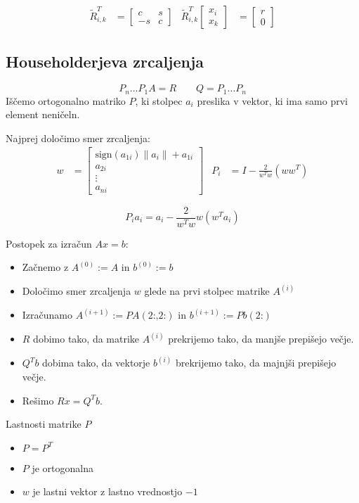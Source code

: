\begin{multicols}{5}
\begin{align*}
	\tilde{R}_{i,k}^T &= \begin{bmatrix}
		c & s \\
		-s & c
	\end{bmatrix} &
	\tilde{R}_{i,k}^T \begin{bmatrix}
		x_i \\ x_k
	\end{bmatrix}
	&=
	\begin{bmatrix}
		r \\ 0
	\end{bmatrix}
\end{align*}

\subsection{Householderjeva zrcaljenja}
\[ P_n \dots P_1 A = R \qquad Q = P_1 \dots P_n\]
Iščemo ortogonalno matriko $P$, ki stolpec $a_i$ preslika v vektor, ki ima samo prvi element neničeln.

Najprej določimo smer zrcaljenja:
\begin{align*}
	w &= \begin{bmatrix}
		\text{sign}(a_{1i}) \| a_i \| + a_{1i} \\
		a_{2i} \\
		\vdots \\
		a_{ni}
	\end{bmatrix} &
	P_i &= I - \frac{2}{w^Tw}(ww^T)
\end{align*}

\[ P_i a_i = a_i - \frac{2}{w^Tw}w(w^Ta_i) \]

Postopek za izračun $Ax = b:$
\begin{itemize}
	\item Začnemo z $A^{(0)} := A$ in $b^{(0)} := b$
	\item Določimo smer zrcaljenja $w$ glede na prvi stolpec matrike $A^{(i)}$
	\item Izračunamo $A^{(i+1)} := PA(\text{2:,2:})$ in $b^{(i+1)} := Pb(\text{2:})$
	\item $R$ dobimo tako, da matrike $A^{(i)}$ prekrijemo tako, da manjše prepišejo večje.
	\item $Q^Tb$ dobima tako, da vektorje $b^{(i)}$ brekrijemo tako, da majnjši prepišejo večje.
	\item Rešimo $Rx = Q^Tb$.
\end{itemize}

Lastnosti matrike $P$
\begin{itemize}
	\item $P = P^T$
	\item $P$ je ortogonalna
	\item $w$ je lastni vektor z lastno vrednostjo $-1$
\end{itemize}


\end{multicols}

